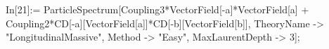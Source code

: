 In[21]:= ParticleSpectrum[Coupling3*VectorField[-a]*VectorField[a] + Coupling2*CD[-a][VectorField[a]]*CD[-b][VectorField[b]], TheoryName -> "LongitudinalMassive", Method -> "Easy", MaxLaurentDepth -> 3]; 